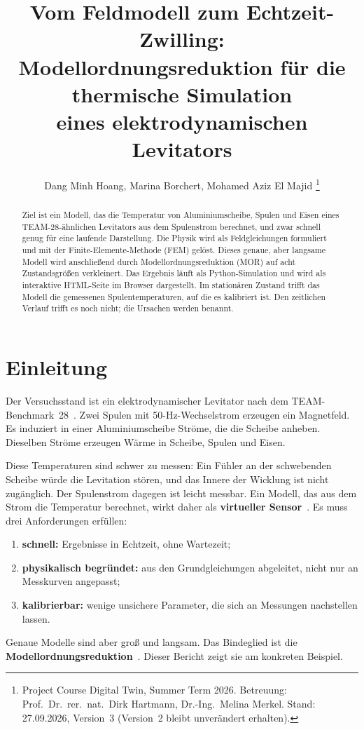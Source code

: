 \documentclass[a4paper, 10pt, conference]{ieeeconf}
\title{\LARGE \bf
Vom Feldmodell zum Echtzeit-Zwilling:\\
Modellordnungsreduktion für die thermische Simulation\\
eines elektrodynamischen Levitators
}
\author{Dang Minh Hoang, Marina Borchert, Mohamed Aziz El Majid
\thanks{Project Course Digital Twin, Summer Term 2026. Betreuung: Prof.\ Dr.\ rer.\ nat.\ Dirk Hartmann, Dr.-Ing.\ Melina Merkel. Stand: 27.09.2026, Version~3 (Version~2 bleibt unverändert erhalten).}%
}
\begin{document}
\maketitle
\thispagestyle{plain}
\pagestyle{plain}

\begin{abstract}
Ziel ist ein Modell, das die Temperatur von Aluminiumscheibe, Spulen und
Eisen eines TEAM-28-ähnlichen Levitators aus dem Spulenstrom berechnet, und
zwar schnell genug für eine laufende Darstellung. Die Physik wird als
Feldgleichungen formuliert und mit der Finite-Elemente-Methode (FEM)
gelöst. Dieses genaue, aber langsame Modell wird anschließend durch
Modellordnungsreduktion (MOR) auf acht Zustandsgrößen verkleinert. Das
Ergebnis läuft als Python-Simulation und wird als interaktive HTML-Seite im
Browser dargestellt. Im stationären Zustand trifft das Modell die gemessenen
Spulentemperaturen, auf die es kalibriert ist. Den zeitlichen Verlauf trifft
es noch nicht; die Ursachen werden benannt.
\end{abstract}

\section{Einleitung}
\label{sec:intro}

Der Versuchsstand ist ein elektrodynamischer Levitator nach dem
TEAM-Benchmark~28~\cite{team28}. Zwei Spulen mit 50-Hz-Wechselstrom erzeugen
ein Magnetfeld. Es induziert in einer Aluminiumscheibe Ströme, die die
Scheibe anheben. Dieselben Ströme erzeugen Wärme in Scheibe, Spulen und
Eisen.

Diese Temperaturen sind schwer zu messen: Ein Fühler an der schwebenden
Scheibe würde die Levitation stören, und das Innere der Wicklung ist nicht
zugänglich. Der Spulenstrom dagegen ist leicht messbar. Ein Modell, das aus
dem Strom die Temperatur berechnet, wirkt daher als \textbf{virtueller
Sensor}~\cite{hartmann2025golden}. Es muss drei Anforderungen erfüllen:
\begin{enumerate}[leftmargin=*]
  \item \textbf{schnell:} Ergebnisse in Echtzeit, ohne Wartezeit;
  \item \textbf{physikalisch begründet:} aus den Grundgleichungen
        abgeleitet, nicht nur an Messkurven angepasst;
  \item \textbf{kalibrierbar:} wenige unsichere Parameter, die sich an
        Messungen nachstellen lassen.
\end{enumerate}
Genaue Modelle sind aber groß und langsam. Das Bindeglied ist die
\textbf{Modellordnungsreduktion}~\cite{hartmann2018mor}. Dieser Bericht zeigt
sie am konkreten Beispiel.
\end{document}
